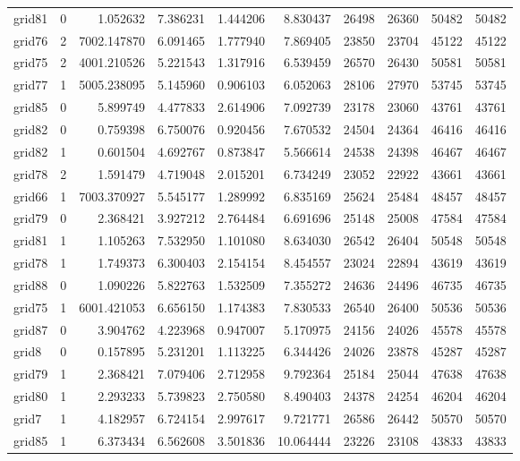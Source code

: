 \begin{longtable}{|l|r|r|r|r|r|r|r|r|r|}
grid81 & 0 & 1.052632 & 7.386231 & 1.444206 & 8.830437 & 26498 & 26360 & 50482 & 50482 \\
grid76 & 2 & 7002.147870 & 6.091465 & 1.777940 & 7.869405 & 23850 & 23704 & 45122 & 45122 \\
grid75 & 2 & 4001.210526 & 5.221543 & 1.317916 & 6.539459 & 26570 & 26430 & 50581 & 50581 \\
grid77 & 1 & 5005.238095 & 5.145960 & 0.906103 & 6.052063 & 28106 & 27970 & 53745 & 53745 \\
grid85 & 0 & 5.899749 & 4.477833 & 2.614906 & 7.092739 & 23178 & 23060 & 43761 & 43761 \\
grid82 & 0 & 0.759398 & 6.750076 & 0.920456 & 7.670532 & 24504 & 24364 & 46416 & 46416 \\
grid82 & 1 & 0.601504 & 4.692767 & 0.873847 & 5.566614 & 24538 & 24398 & 46467 & 46467 \\
grid78 & 2 & 1.591479 & 4.719048 & 2.015201 & 6.734249 & 23052 & 22922 & 43661 & 43661 \\
grid66 & 1 & 7003.370927 & 5.545177 & 1.289992 & 6.835169 & 25624 & 25484 & 48457 & 48457 \\
grid79 & 0 & 2.368421 & 3.927212 & 2.764484 & 6.691696 & 25148 & 25008 & 47584 & 47584 \\
grid81 & 1 & 1.105263 & 7.532950 & 1.101080 & 8.634030 & 26542 & 26404 & 50548 & 50548 \\
grid78 & 1 & 1.749373 & 6.300403 & 2.154154 & 8.454557 & 23024 & 22894 & 43619 & 43619 \\
grid88 & 0 & 1.090226 & 5.822763 & 1.532509 & 7.355272 & 24636 & 24496 & 46735 & 46735 \\
grid75 & 1 & 6001.421053 & 6.656150 & 1.174383 & 7.830533 & 26540 & 26400 & 50536 & 50536 \\
grid87 & 0 & 3.904762 & 4.223968 & 0.947007 & 5.170975 & 24156 & 24026 & 45578 & 45578 \\
grid8 & 0 & 0.157895 & 5.231201 & 1.113225 & 6.344426 & 24026 & 23878 & 45287 & 45287 \\
grid79 & 1 & 2.368421 & 7.079406 & 2.712958 & 9.792364 & 25184 & 25044 & 47638 & 47638 \\
grid80 & 1 & 2.293233 & 5.739823 & 2.750580 & 8.490403 & 24378 & 24254 & 46204 & 46204 \\
grid7 & 1 & 4.182957 & 6.724154 & 2.997617 & 9.721771 & 26586 & 26442 & 50570 & 50570 \\
grid85 & 1 & 6.373434 & 6.562608 & 3.501836 & 10.064444 & 23226 & 23108 & 43833 & 43833 \\

\end{longtable}
